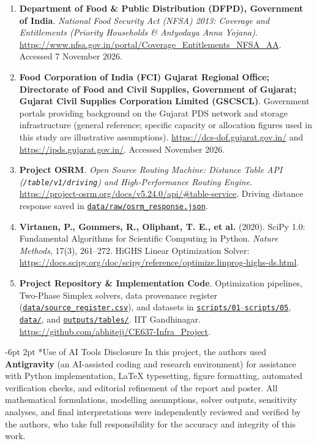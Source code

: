 \documentclass[10pt,a4paper]{article}
\makeatletter
\renewcommand\subsection{\@startsection{subsection}{2}{\z@}%
                                     {-6pt \@plus -2pt \@minus -1pt}%
                                     {2pt \@plus 1pt}%
                                     {\normalfont\large\bfseries}}
\makeatother
\begin{document}
\begin{enumerate}\setlength{\itemsep}{10pt}
\item \textbf{Department of Food \& Public Distribution (DFPD), Government of India}. \textit{National Food Security Act (NFSA) 2013: Coverage and Entitlements (Priority Households \& Antyodaya Anna Yojana)}. \url{https://www.nfsa.gov.in/portal/Coverage_Entitlements_NFSA_AA}. Accessed 7 November 2026.
\item \textbf{Food Corporation of India (FCI) Gujarat Regional Office; Directorate of Food and Civil Supplies, Government of Gujarat; Gujarat Civil Supplies Corporation Limited (GSCSCL)}. Government portals providing background on the Gujarat PDS network and storage infrastructure (general reference; specific capacity or allocation figures used in this study are illustrative assumptions). \url{https://dcs-dof.gujarat.gov.in/} and \url{https://ipds.gujarat.gov.in/}. Accessed November 2026.
\item \textbf{Project OSRM}. \textit{Open Source Routing Machine: Distance Table API (\texttt{/table/v1/driving}) and High-Performance Routing Engine}. \url{https://project-osrm.org/docs/v5.24.0/api/#table-service}. Driving distance response saved in \href{https://github.com/abhitejj/CE637-Infra_Project/blob/main/data/raw/osrm_response.json}{\texttt{data/raw/osrm\_response.json}}.
\item \textbf{Virtanen, P., Gommers, R., Oliphant, T. E., et al.} (2020). SciPy 1.0: Fundamental Algorithms for Scientific Computing in Python. \textit{Nature Methods}, 17(3), 261--272. HiGHS Linear Optimization Solver: \url{https://docs.scipy.org/doc/scipy/reference/optimize.linprog-highs-ds.html}.
\item \textbf{Project Repository \& Implementation Code}. Optimization pipelines, Two-Phase Simplex solvers, data provenance register (\href{https://github.com/abhitejj/CE637-Infra_Project/blob/main/data/source_register.csv}{\texttt{data/source\_register.csv}}), and datasets in \href{https://github.com/abhitejj/CE637-Infra_Project/tree/main/scripts}{\texttt{scripts/01}--\texttt{scripts/05}}, \href{https://github.com/abhitejj/CE637-Infra_Project/tree/main/data}{\texttt{data/}}, and \href{https://github.com/abhitejj/CE637-Infra_Project/tree/main/outputs/tables}{\texttt{outputs/tables/}}. IIT Gandhinagar. \url{https://github.com/abhitejj/CE637-Infra_Project}.
\end{enumerate}

\vspace{16pt}
\subsection*{Use of AI Tools Disclosure}
In this project, the authors used \textbf{Antigravity} (an AI-assisted coding and research environment) for assistance with Python implementation, LaTeX typesetting, figure formatting, automated verification checks, and editorial refinement of the report and poster. All mathematical formulations, modelling assumptions, solver outputs, sensitivity analyses, and final interpretations were independently reviewed and verified by the authors, who take full responsibility for the accuracy and integrity of this work.
\end{document}
